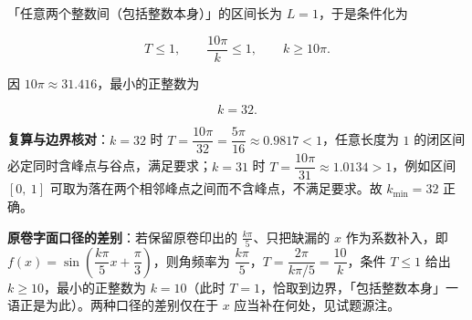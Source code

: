 \begin{answer}
「任意两个整数间（包括整数本身）」的区间长为 $L=1$，于是条件化为

\nopagebreak[4]
\[
T\leqslant1,\qquad \frac{10\pi}{k}\leqslant1,\qquad k\geqslant10\pi.
\]

因 $10\pi\approx31.416$，最小的正整数为

\nopagebreak[4]
\[
k=32.
\]

\textbf{复算与边界核对}：$k=32$ 时 $T=\dfrac{10\pi}{32}=\dfrac{5\pi}{16}\approx0.9817<1$，任意长度为 $1$ 的闭区间必定同时含峰点与谷点，满足要求；$k=31$ 时 $T=\dfrac{10\pi}{31}\approx1.0134>1$，例如区间 $\left[0,\ 1\right]$ 可取为落在两个相邻峰点之间而不含峰点，不满足要求。故 $k_{\min}=32$ 正确。

\textbf{原卷字面口径的差别}：若保留原卷印出的 $\frac{k\pi}{5}$、只把缺漏的 $x$ 作为系数补入，即 $f(x)=\sin\left(\dfrac{k\pi}{5}x+\dfrac{\pi}{3}\right)$，则角频率为 $\dfrac{k\pi}{5}$，$T=\dfrac{2\pi}{k\pi/5}=\dfrac{10}{k}$，条件 $T\leqslant1$ 给出 $k\geqslant10$，最小的正整数为 $k=10$（此时 $T=1$，恰取到边界，「包括整数本身」一语正是为此）。两种口径的差别仅在于 $x$ 应当补在何处，见试题源注。



\end{answer}
